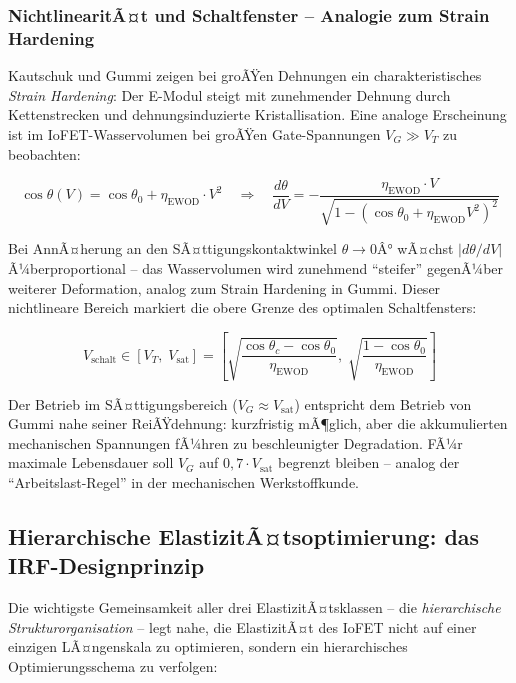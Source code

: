 ﻿\documentclass[a4paper,12pt]{scrreprt}
\theoremstyle{definition}
\begin{document}
\subsubsection{NichtlinearitÃ¤t und Schaltfenster -- Analogie zum Strain Hardening}

Kautschuk und Gummi zeigen bei groÃŸen Dehnungen ein charakteristisches
\emph{Strain Hardening}: Der E-Modul steigt mit zunehmender Dehnung
durch Kettenstrecken und dehnungsinduzierte Kristallisation. Eine analoge
Erscheinung ist im IoFET-Wasservolumen bei groÃŸen Gate-Spannungen
$V_G \gg V_T$ zu beobachten:

\begin{equation}
	\cos\theta(V) = \cos\theta_0 + \eta_{\mathrm{EWOD}} \cdot V^2
	\quad \Rightarrow \quad
	\frac{d\theta}{dV} = -\frac{\eta_{\mathrm{EWOD}} \cdot V}{\sqrt{1 - (\cos\theta_0 + \eta_{\mathrm{EWOD}} V^2)^2}}
	\label{eq:ewod_nichtlinear}
\end{equation}

Bei AnnÃ¤herung an den SÃ¤ttigungskontaktwinkel $\theta \to 0Â°$ wÃ¤chst
$|d\theta/dV|$ Ã¼berproportional -- das Wasservolumen wird zunehmend
``steifer'' gegenÃ¼ber weiterer Deformation, analog zum Strain Hardening
in Gummi. Dieser nichtlineare Bereich markiert die obere Grenze des
optimalen Schaltfensters:

\begin{equation}
	V_{\mathrm{schalt}} \in \left[V_T, \; V_{\mathrm{sat}}\right]
	= \left[\sqrt{\frac{\cos\theta_c - \cos\theta_0}{\eta_{\mathrm{EWOD}}}},\;
	\sqrt{\frac{1 - \cos\theta_0}{\eta_{\mathrm{EWOD}}}}\right]
	\label{eq:schaltfenster}
\end{equation}

Der Betrieb im SÃ¤ttigungsbereich ($V_G \approx V_{\mathrm{sat}}$) entspricht
dem Betrieb von Gummi nahe seiner ReiÃŸdehnung: kurzfristig mÃ¶glich,
aber die akkumulierten mechanischen Spannungen fÃ¼hren zu beschleunigter
Degradation. FÃ¼r maximale Lebensdauer soll $V_G$ auf $0{,}7 \cdot V_{\mathrm{sat}}$
begrenzt bleiben -- analog der ``Arbeitslast-Regel'' in der mechanischen
Werkstoffkunde.

\subsection{Hierarchische ElastizitÃ¤tsoptimierung: das IRF-Designprinzip}

Die wichtigste Gemeinsamkeit aller drei ElastizitÃ¤tsklassen -- die
\emph{hierarchische Strukturorganisation} -- legt nahe, die ElastizitÃ¤t
des IoFET nicht auf einer einzigen LÃ¤ngenskala zu optimieren, sondern
ein hierarchisches Optimierungsschema zu verfolgen:
\end{document}

